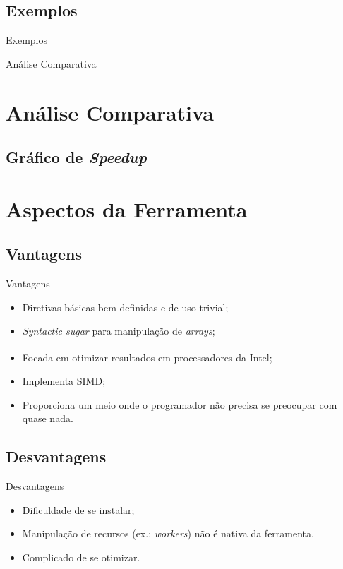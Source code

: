 \documentclass{beamer}
\begin{document}
\subsection{Exemplos}
\begin{frame}{Exemplos}
\end{frame}

\begin{frame}{Análise Comparativa}
\section{Análise Comparativa}
\subsection{Gráfico de \protect\textit{Speedup}}
\end{frame}

\section{Aspectos da Ferramenta}
\subsection{Vantagens}
\begin{frame}{Vantagens}
\begin{itemize}
    \item Diretivas básicas bem definidas e de uso trivial;
    \item \textit{Syntactic sugar} para manipulação de \textit{arrays};
    \item Focada em otimizar resultados em processadores da
    Intel\textsuperscript{\textregistered};
    \item Implementa SIMD;
    \item Proporciona um meio onde o programador não precisa se preocupar com
    quase nada.
\end{itemize}
\end{frame}


\subsection{Desvantagens}
\begin{frame}{Desvantagens}
\begin{itemize}
    \item Dificuldade de se instalar;
    \item Manipulação de recursos (ex.: \textit{workers}) não é nativa da
    ferramenta.
    \item Complicado de se otimizar.
\end{itemize}

\end{frame}
\end{document}
